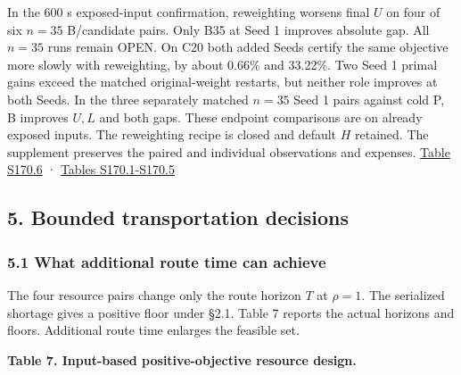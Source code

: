 \documentclass[
  american,
  11pt,
]{article}
\begin{document}
In the 600 s exposed-input confirmation, reweighting worsens final \(U\)
on four of six \(n=35\) B/candidate pairs. Only B35 at Seed 1 improves
absolute gap. All \(n=35\) runs remain OPEN. On C20 both added Seeds
certify the same objective more slowly with reweighting, by about 0.66\%
and 33.22\%. Two Seed 1 primal gains exceed the matched original-weight
restarts, but neither role improves at both Seeds. In the three
separately matched \(n=35\) Seed 1 pairs against cold P, B improves
\(U,L\) and both gaps. These endpoint comparisons are on already exposed
inputs. The reweighting recipe is closed and default \(H\) retained. The
supplement preserves the paired and individual observations and
expenses.
\href{https://github.com/yifanXovo/TailoredExact/blob/codex/round172-journal-manuscript/results/unified_exact_round137/supplement.md\#matched-initialization-endpoints-by-role-and-seed}{Table
S170.6} ·
\href{https://github.com/yifanXovo/TailoredExact/blob/codex/round172-journal-manuscript/results/unified_exact_round137/supplement.md\#s170-fixed-paid-initialization-and-matched-cold-controls}{Tables
S170.1-S170.5}

\subsection{5. Bounded transportation
decisions}\label{bounded-transportation-decisions}

\subsubsection{5.1 What additional route time can
achieve}\label{what-additional-route-time-can-achieve}

The four resource pairs change only the route horizon \(T\) at
\(\rho=1\). The serialized shortage gives a positive floor under §2.1.
Table 7 reports the actual horizons and floors. Additional route time
enlarges the feasible set.



\textbf{Table 7. Input-based positive-objective resource design.}
\end{document}
